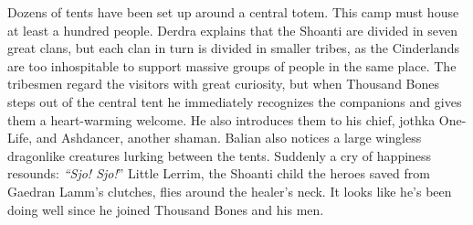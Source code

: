 Dozens of tents have been set up around a central totem. This camp must house at least a hundred people. Derdra explains that the Shoanti are divided in seven great clans, but each clan in turn is divided in smaller tribes, as the Cinderlands are too inhospitable to support massive groups of people in the same place. The tribesmen regard the visitors with great curiosity, but when Thousand Bones steps out of the central tent he immediately recognizes the companions and gives them a heart-warming welcome. He also introduces them to his chief, jothka One-Life, and Ashdancer, another shaman. Balian also notices a large wingless dragonlike creatures lurking between the tents. Suddenly a cry of happiness resounds: {\itshape``Sjo! Sjo!}'' Little Lerrim, the Shoanti child the heroes saved from Gaedran Lamm's clutches, flies around the healer's neck. It looks like he's been doing well since he joined Thousand Bones and his men.\\

